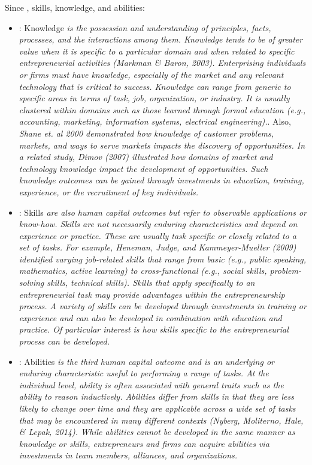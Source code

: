 Since \citep{marvel2016human}, skills, knowledge, and abilities:
\begin{itemize}
  \item : Knowledge \textit{is the possession and understanding of principles, facts, processes, and the interactions among them. Knowledge tends to be of greater value when it is specific to a particular domain and when related to specific entrepreneurial activities (Markman & Baron, 2003). Enterprising individuals or firms must have knowledge, especially of the market and any relevant technology that is critical to success. Knowledge can range from generic to specific areas in terms of task, job, organization, or industry. It is usually clustered within domains such as those learned through formal education (e.g., accounting, marketing, information systems, electrical engineering).}. Also, \textit{Shane et. al 2000 demonstrated how knowledge of customer problems, markets, and ways to serve markets impacts the discovery of opportunities. In a related study, Dimov (2007) illustrated how domains of market and technology knowledge impact the development of opportunities. Such knowledge outcomes can be gained through investments in education, training, experience, or the recruitment of key individuals.}
  \item : Skills \textit{are also human capital outcomes but refer to observable applications or know-how. Skills are not necessarily enduring characteristics and depend on experience or practice. These are usually task specific or closely related to a set of tasks. For example, Heneman, Judge, and Kammeyer-Mueller (2009) identified varying job-related skills that range from basic (e.g., public speaking, mathematics, active learning) to cross-functional (e.g., social skills, problem-solving skills, technical skills). Skills that apply specifically to an entrepreneurial task may provide advantages within the entrepreneurship process. A variety of skills can be developed through investments in training or experience and can also be developed in combination with education and practice. Of particular interest is how skills specific to the entrepreneurial process can be developed.}
  \item : Abilities \textit{is the third human capital outcome and is an underlying or enduring characteristic useful to performing a range of tasks. At the individual level, ability is often associated with general traits such as the ability to reason inductively. Abilities differ from skills in that they are less likely to change over time and they are applicable across a wide set of tasks that may be encountered in many different contexts (Nyberg, Moliterno, Hale, & Lepak, 2014). While abilities cannot be developed in the same manner as knowledge or skills, entrepreneurs and firms can acquire abilities via investments in team members, alliances, and organizations.}
\end{itemize}

